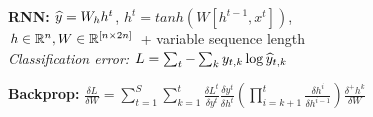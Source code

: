 \textbf{RNN:} $\widehat{y} = W_{h} h^t$, $h^t = tanh(W [h^{t-1}, x^t])$,\\ $h\in \mathbb{R}^n, W \in \mathbb{R}^{[n \times 2n]}$
+ variable sequence length\\
\textit{Classification error:} $L = \sum_t - \sum_k y_{t,k} \log \widehat{y}_{t,k}$\\

\textbf{Backprop:} $\frac{\delta L}{\delta W} 
= \sum_{t=1}^S \sum_{k=1}^t \frac{\delta L^t}{\delta y^t} \frac{\delta y^t}{\delta h^t} (\prod_{i = k+1}^t \frac{\delta h^i}{\delta h^{i-1}})\frac{\delta^+ h^k}{\delta W}$\\

